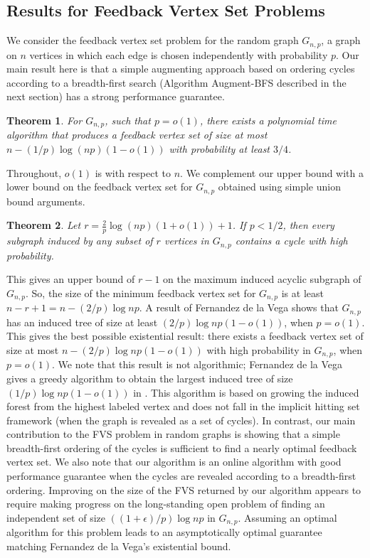 \documentclass[11pt]{article}
\newtheorem{theorem}{Theorem}
\def\eps{\epsilon}
\begin{document}
\subsection{Results for Feedback Vertex Set Problems}
We consider the feedback vertex set problem for the random graph $G_{n,p}$, a graph on $n$ vertices in which each edge is chosen independently with probability $p$. Our main result here is that a simple augmenting approach based on ordering cycles according to a breadth-first search (Algorithm Augment-BFS described in the next section) has a strong performance guarantee.

\begin{theorem}\label{theorem:undirected-MFVS}
For $G_{n,p}$, such that $p=o(1)$, there exists a polynomial time algorithm that produces a feedback vertex set of size at most $n-(1/p)\log{(np)}(1-o(1))$ with probability at least $3/4$.
\end{theorem}
Throughout, $o(1)$ is with respect to $n$. We complement our upper bound with a lower bound on the feedback vertex set for $G_{n,p}$ obtained using simple union bound arguments.
\begin{theorem}\label{theorem:undirected-FVSlowerbound}
Let $r=\frac{2}{p}\log{(np)}(1+o(1))+1$. If $p<1/2$, then every subgraph induced by any subset of $r$ vertices in $G_{n,p}$ contains a cycle with high probability.
\end{theorem}

This gives an upper bound of $r-1$ on the maximum induced acyclic subgraph of $G_{n,p}$. So, the size of the minimum feedback vertex set for $G_{n,p}$ is at least $n-r+1=n-(2/p)\log{np}$. A result of Fernandez de la Vega \cite{delavega96} shows that $G_{n,p}$ has an induced tree of size at least $(2/p)\log{np}(1-o(1))$, when $p=o(1)$. This gives the best possible existential result: there exists a feedback vertex set of size at most $n-(2/p)\log{np}(1-o(1))$ with high probability in $G_{n,p}$, when $p=o(1)$. We note that this result is not algorithmic; Fernandez de la Vega gives a greedy algorithm to obtain the largest induced tree of size $(1/p)\log{np}(1-o(1))$ in \cite{delavega86}. This algorithm is based on growing the induced forest from the highest labeled vertex and does not fall in the implicit hitting set framework (when the graph is revealed as a set of cycles). In contrast, our main contribution to the FVS problem in random graphs is showing that a simple breadth-first ordering of the cycles is sufficient to find a nearly optimal feedback vertex set. We also note that our algorithm is an online algorithm with good performance guarantee when the cycles are revealed according to a breadth-first ordering. Improving on the size of the FVS returned by our algorithm appears to require making progress on the long-standing open problem of finding an independent set of size $((1+\eps)/p)\log {np}$ in $G_{n,p}$. Assuming an optimal algorithm for this problem leads to an asymptotically optimal guarantee matching Fernandez de la Vega's existential bound.
\end{document}
